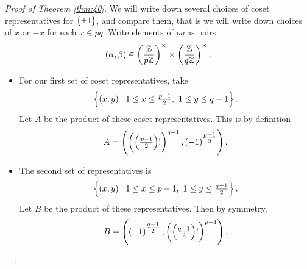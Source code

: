 \begin{proof}[Proof of Theorem \ref{thm:40}]
We will write down several choices of coset representatives for $ \cbr{\pm 1} $, and compare them, that is we will write down choices of $ x $ or $ -x $ for each $ x \in \unit{pq} $. Write elements of $ \unit{pq} $ as pairs
$$ \br{\alpha, \beta} \in \Unit{p} \times \Unit{q}. $$
\begin{itemize}
\item For our first set of coset representatives, take
$$ \cbr{\br{x, y} \mid 1 \le x \le \tfrac{p - 1}{2}, \ 1 \le y \le q - 1}. $$
Let $ A $ be the product of these coset representatives. This is by definition
$$ A = \br{\br{\br{\tfrac{p - 1}{2}}!}^{q - 1}, \br{-1}^{\tfrac{p - 1}{2}}}. $$
\item The second set of representatives is
$$ \cbr{\br{x, y} \mid 1 \le x \le p - 1, \ 1 \le y \le \tfrac{q - 1}{2}}. $$
Let $ B $ be the product of these representatives. Then by symmetry,
$$ B = \br{\br{-1}^{\tfrac{q - 1}{2}}, \br{\br{\tfrac{q - 1}{2}}!}^{p - 1}}. $$

\pagebreak


\end{itemize}
\end{proof}
